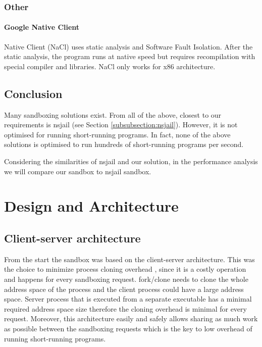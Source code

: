 \documentclass[en]{pracamgr}
\begin{document}
\subsection{Other}

\subsubsection{Google Native Client}
Native Client (NaCl) \cite{yee2010native} uses static analysis and Software Fault Isolation. After the static analysis, the program runs at native speed but requires recompilation with special compiler and libraries. NaCl only works for x86 architecture.

\section{Conclusion}

Many sandboxing solutions exist. From all of the above, closest to our requirements is nsjail (see Section \ref{subsubsection:nsjail}). However, it is not optimised for running short-running programs. In fact, none of the above solutions is optimised to run hundreds of short-running programs per second.

Considering the similarities of nsjail and our solution, in the performance analysis we will compare our sandbox to nsjail sandbox.


\chapter{Design and Architecture}\label{chapter:design}

\section{Client-server architecture}

From the start the sandbox was based on the client-server architecture. This was the choice to minimize process cloning overhead \cite{redis-latency-generated-by-fork}, since it is a costly operation and happens for every sandboxing request. fork/clone needs to clone the whole address space of the process and the client process could have a large address space. Server process that is executed from a separate executable has a minimal required address space size therefore the cloning overhead is minimal for every request. Moreover, this architecture easily and safely allows sharing as much work as possible between the sandboxing requests which is the key to low overhead of running short-running programs.
\end{document}
